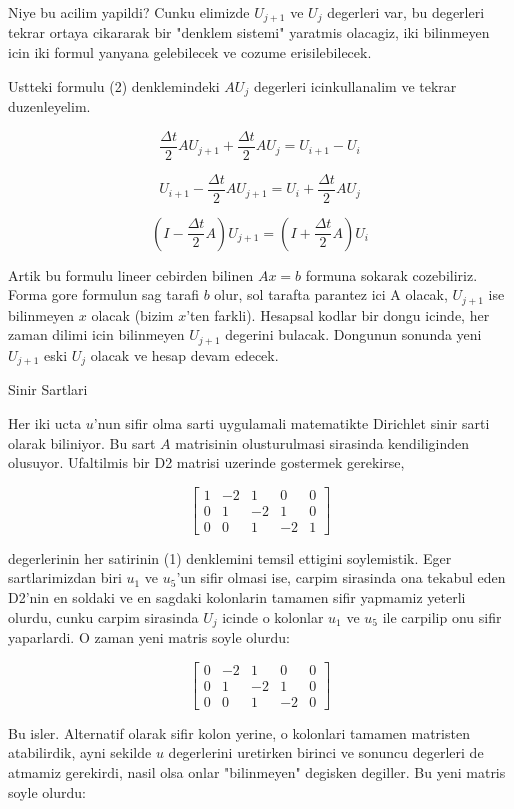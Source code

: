 \documentclass[12pt,fleqn]{article}\usepackage{../common}
\begin{document}
Niye bu acilim yapildi? Cunku elimizde $U_{j+1}$ ve $U_j$ degerleri var, bu
degerleri tekrar ortaya cikararak bir "denklem sistemi" yaratmis olacagiz, iki
bilinmeyen icin iki formul yanyana gelebilecek ve cozume erisilebilecek. 

Ustteki formulu (2) denklemindeki $AU_j$ degerleri
icinkullanalim ve tekrar duzenleyelim.

$$ \frac{\Delta t}{2}AU_{j+1} + \frac{\Delta t}{2}AU_j = U_{i+1} - U_i  $$

$$ U_{i+1} - \frac{\Delta t}{2}AU_{j+1} = U_i + \frac{\Delta t}{2}AU_j  $$

$$ (I - \frac{\Delta t}{2}A) U_{j+1} = (I + \frac{\Delta t}{2}A)U_i $$

Artik bu formulu lineer cebirden bilinen $Ax=b$ formuna sokarak
cozebiliriz. Forma gore formulun sag tarafi $b$ olur, sol tarafta parantez ici A
olacak, $U_{j+1}$ ise bilinmeyen $x$ olacak (bizim $x$'ten farkli). Hesapsal
kodlar bir dongu icinde, her zaman dilimi icin bilinmeyen $U_{j+1}$ degerini
bulacak. Dongunun sonunda yeni $U_{j+1}$ eski $U_j$ olacak ve hesap devam
edecek. 

Sinir Sartlari

Her iki ucta $u$'nun sifir olma sarti uygulamali matematikte Dirichlet sinir
sarti olarak biliniyor. Bu sart $A$ matrisinin olusturulmasi sirasinda
kendiliginden olusuyor. Ufaltilmis bir D2 matrisi uzerinde gostermek gerekirse, 

$$ \left[ \begin{array}{ccccc}
1 & -2 & 1 & 0 & 0 \\
0 & 1 & -2 & 1 & 0 \\
0 & 0 & 1 & -2 & 1
\end{array} \right]
 $$

degerlerinin her satirinin (1) denklemini temsil ettigini
soylemistik. Eger sartlarimizdan biri $u_1$ ve $u_5$'un sifir olmasi ise, carpim
sirasinda ona tekabul eden D2'nin en soldaki ve en sagdaki kolonlarin tamamen
sifir yapmamiz yeterli olurdu, cunku carpim sirasinda $U_j$ icinde o kolonlar
$u_1$ ve $u_5$ ile carpilip onu sifir yaparlardi. O zaman yeni matris soyle
olurdu:

$$ 
\left[ \begin{array}{ccccc}
0 & -2 & 1 & 0 & 0 \\
0 & 1 & -2 & 1 & 0 \\
0 & 0 & 1 & -2 & 0
\end{array} \right]
 $$

Bu isler. Alternatif olarak sifir kolon yerine, o kolonlari tamamen matristen
atabilirdik, ayni sekilde $u$ degerlerini uretirken birinci ve sonuncu degerleri
de atmamiz gerekirdi, nasil olsa onlar "bilinmeyen" degisken degiller. Bu yeni
matris soyle olurdu:
\end{document}
